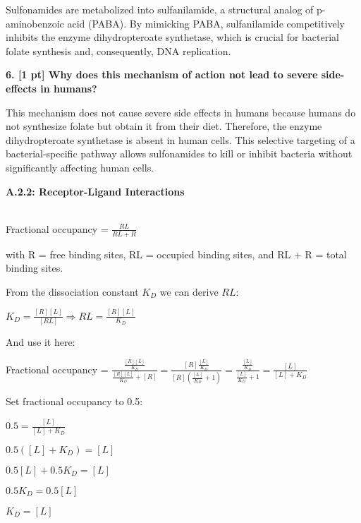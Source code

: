 \documentclass[a4paper,10pt]{article}
\begin{document}
Sulfonamides are metabolized into sulfanilamide, a structural analog of p-aminobenzoic acid (PABA). By mimicking PABA, sulfanilamide competitively inhibits the enzyme dihydropteroate synthetase, which is crucial for bacterial folate synthesis and, consequently, DNA replication. \cite{sulfonamide}

\textbf{6. [1 pt] Why does this mechanism of action not lead to severe side-eﬀects in humans?}

This mechanism does not cause severe side effects in humans because humans do not synthesize folate but obtain it from their diet. Therefore, the enzyme dihydropteroate synthetase is absent in human cells. This selective targeting of a bacterial-specific pathway allows sulfonamides to kill or inhibit bacteria without significantly affecting human cells. \cite{Dihydropteroatesynthase}

\newpage
\begin{large}
	\vspace{1.0cm}
	\textbf{A.2.2: Receptor-Ligand Interactions}
\end{large}	\\ [2mm]

Fractional occupancy = $\frac{RL}{RL + R}$ 

with R = free binding sites, RL = occupied binding sites, and RL + R = total binding sites. \cite{receptor}

From the dissociation constant $K_D$ we can derive $RL$:

$K_D = \frac{[R][L]}{[RL]} \Longrightarrow RL = \frac{[R][L]}{K_D}$

And use it here:

Fractional occupancy = $\frac{\frac{[R][L]}{K_D}}{\frac{[R][L]}{K_D} + [R]} = \frac{[R]\frac{[L]}{K_D}}{[R](\frac{[L]}{K_D} + 1)} = \frac{\frac{[L]}{K_D}}{\frac{[L]}{K_D} + 1} = \frac{[L]}{[L] + K_D}$ 

Set fractional occupancy to 0.5:

$0.5 = \frac{[L]}{[L] + K_D}$

$0.5([L] + K_D) = [L]$

$0.5[L] + 0.5 K_D = [L]$

$0.5 K_D = 0.5[L]$

$K_D = [L]$





\end{document}
